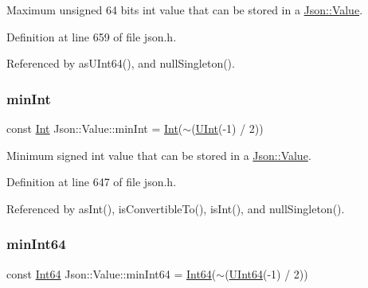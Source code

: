 Maximum unsigned 64 bits int value that can be stored in a \hyperlink{class_json_1_1_value}{Json\+::\+Value}. 



Definition at line 659 of file json.\+h.



Referenced by as\+U\+Int64(), and null\+Singleton().

\mbox{\label{class_json_1_1_value_a7df8a39e2502b8c92a6a41e3d752d2c8}} 
\subsubsection{\texorpdfstring{min\+Int}{minInt}}
{\footnotesize\ttfamily const \hyperlink{class_json_1_1_value_abdf7a7ff73eb130ffcab28504ffdb405}{Int} Json\+::\+Value\+::min\+Int = \hyperlink{class_json_1_1_value_abdf7a7ff73eb130ffcab28504ffdb405}{Int}($\sim$(\hyperlink{class_json_1_1_value_a0933d59b45793ae4aade1757c322a98d}{U\+Int}(-\/1) / 2))\hspace{0.3cm}{\ttfamily [static]}}



Minimum signed int value that can be stored in a \hyperlink{class_json_1_1_value}{Json\+::\+Value}. 



Definition at line 647 of file json.\+h.



Referenced by as\+Int(), is\+Convertible\+To(), is\+Int(), and null\+Singleton().

\mbox{\label{class_json_1_1_value_a815ef899bc312c93bc426511acfe31a7}} 
\subsubsection{\texorpdfstring{min\+Int64}{minInt64}}
{\footnotesize\ttfamily const \hyperlink{class_json_1_1_value_a1b86af9f85f0f1baa972c3319fa22695}{Int64} Json\+::\+Value\+::min\+Int64 = \hyperlink{class_json_1_1_value_a1b86af9f85f0f1baa972c3319fa22695}{Int64}($\sim$(\hyperlink{class_json_1_1_value_a8b62564be8c087c6d18de180ff4e13e3}{U\+Int64}(-\/1) / 2))\hspace{0.3cm}{\ttfamily [static]}}



